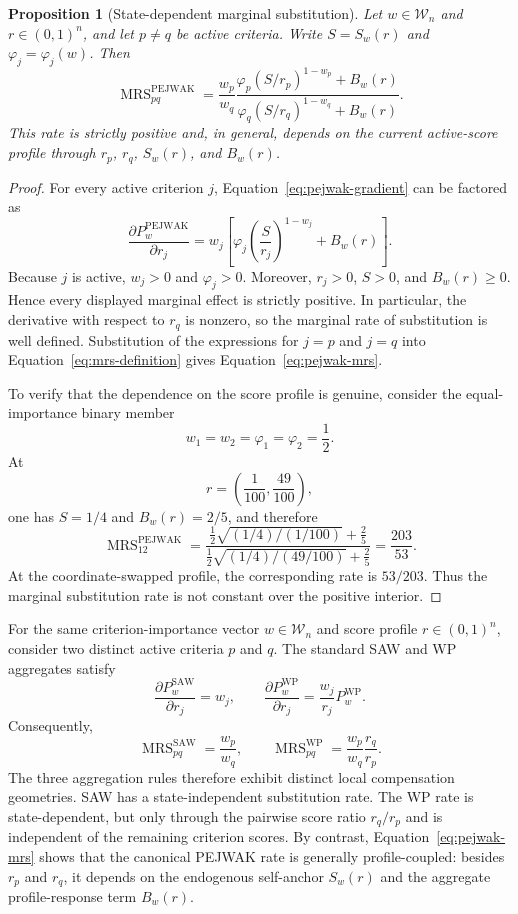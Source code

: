 \documentclass[reqno,11pt]{amsart}
\theoremstyle{definition}
\theoremstyle{plain}
\newtheorem{proposition}{Proposition}
\theoremstyle{remark}
\begin{document}
\begin{proposition}[State-dependent marginal substitution]
Let $w\in\mathcal W_n$ and $r\in(0,1)^n$, and let $p\neq q$ be active
criteria. Write $S=S_w(r)$ and $\varphi_j=\varphi_j(w)$. Then
\begin{equation}
\operatorname{MRS}_{pq}^{\mathrm{PEJWAK}}
=
\frac{w_p}{w_q}
\frac{
\varphi_p\left(S/r_p\right)^{1-w_p}+B_w(r)
}{
\varphi_q\left(S/r_q\right)^{1-w_q}+B_w(r)
}.
\label{eq:pejwak-mrs}
\end{equation}
This rate is strictly positive and, in general, depends on the current
active-score profile through $r_p$, $r_q$, $S_w(r)$, and $B_w(r)$.
\end{proposition}

\begin{proof}
For every active criterion $j$, Equation~\eqref{eq:pejwak-gradient}
can be factored as
\[
\frac{\partial P_w^{\mathrm{PEJWAK}}}{\partial r_j}
=
w_j
\left[
\varphi_j
\left(\frac{S}{r_j}\right)^{1-w_j}
+
B_w(r)
\right].
\]
Because $j$ is active, $w_j>0$ and $\varphi_j>0$. Moreover,
$r_j>0$, $S>0$, and $B_w(r)\geq0$. Hence every displayed marginal
effect is strictly positive. In particular, the derivative with respect
to $r_q$ is nonzero, so the marginal rate of substitution is well
defined. Substitution of the expressions for $j=p$ and $j=q$ into
Equation~\eqref{eq:mrs-definition} gives
Equation~\eqref{eq:pejwak-mrs}.

To verify that the dependence on the score profile is genuine, consider
the equal-importance binary member
\[
w_1=w_2=\varphi_1=\varphi_2=\frac12.
\]
At
\[
r=\left(\frac1{100},\frac{49}{100}\right),
\]
one has $S=1/4$ and $B_w(r)=2/5$, and therefore
\[
\operatorname{MRS}_{12}^{\mathrm{PEJWAK}}
=
\frac{
\frac12\sqrt{(1/4)/(1/100)}+\frac25
}{
\frac12\sqrt{(1/4)/(49/100)}+\frac25
}
=
\frac{203}{53}.
\]
At the coordinate-swapped profile, the corresponding rate is
$53/203$. Thus the marginal substitution rate is not constant over
the positive interior.
\end{proof}

For the same criterion-importance vector
$w\in\mathcal W_n$ and score profile $r\in(0,1)^n$, consider two
distinct active criteria $p$ and $q$. The standard SAW and WP
aggregates satisfy
\[
\frac{\partial P_w^{\mathrm{SAW}}}{\partial r_j}
=
w_j,
\qquad
\frac{\partial P_w^{\mathrm{WP}}}{\partial r_j}
=
\frac{w_j}{r_j}P_w^{\mathrm{WP}}.
\]
Consequently,
\begin{equation}
\operatorname{MRS}_{pq}^{\mathrm{SAW}}
=
\frac{w_p}{w_q},
\qquad
\operatorname{MRS}_{pq}^{\mathrm{WP}}
=
\frac{w_p}{w_q}
\frac{r_q}{r_p}.
\label{eq:benchmark-mrs}
\end{equation}
The three aggregation rules therefore exhibit distinct local
compensation geometries. SAW has a state-independent substitution rate.
The WP rate is state-dependent, but only through the pairwise score
ratio $r_q/r_p$ and is independent of the remaining criterion scores.
By contrast, Equation~\eqref{eq:pejwak-mrs} shows that the canonical
PEJWAK rate is generally profile-coupled: besides $r_p$ and $r_q$, it
depends on the endogenous self-anchor $S_w(r)$ and the aggregate
profile-response term $B_w(r)$.
\end{document}
